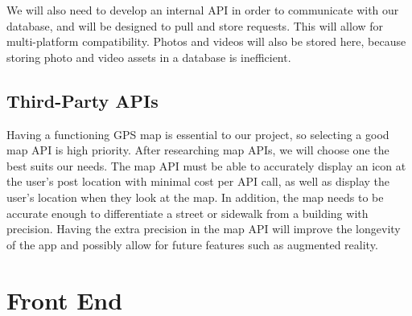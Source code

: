 \documentclass[draftclsnofoot, onecolumn,journal,letterpaper,10pt, compsoc]{IEEEtran}
\begin{document}
We will also need to develop an internal API in order to communicate with our database, and will be designed to pull and store requests. This will allow for multi-platform compatibility. Photos and videos will also be stored here, because storing photo and video assets in a database is inefficient. 

\subsection{Third-Party APIs}
Having a functioning GPS map is essential to our project, so selecting a good map API is high priority. After researching map APIs, we will choose one the best suits our needs. The map API must be able to accurately display an icon at the user's post location with minimal cost per API call, as well as display the user's location when they look at the map. In addition, the map needs to be accurate enough to differentiate a street or sidewalk from a building with precision.  Having the extra precision in the map API will improve the longevity of the app and possibly allow for future features such as augmented reality.

\section{Front End}
\end{document}
